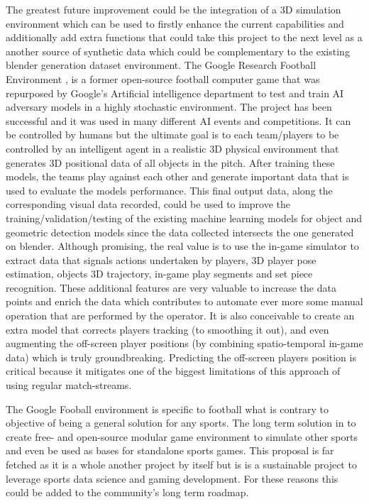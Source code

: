 \documentclass[
    11pt,
    twoside
]{report}
\begin{document}
The greatest future improvement could be the integration of a 3D simulation environment which can be used to firstly enhance the current capabilities and additionally add extra functions that could take this project to the next level as a another source of synthetic data which could be complementary to the existing blender generation dataset environment. The Google Research Football Environment \cite{gfootball_env}, is a former open-source football computer game that was repurposed by Google's Artificial intelligence department to test and train AI adversary models in a highly stochastic environment. The project has been successful and it was used in many different AI events and competitions. It can be controlled by humans but the ultimate goal is to each team/players to be controlled by an intelligent agent in a realistic 3D physical environment that generates 3D positional data of all objects in the pitch. After training these models, the teams play against each other and generate important data that is used to evaluate the models performance. This final output data, along the corresponding visual data recorded, could be used to improve the training/validation/testing of the existing machine learning models for object and geometric detection models since the data collected intersects the one generated on blender. Although promising, the real value is to use the in-game simulator to extract data that signals actions undertaken by players, 3D player pose estimation, objects 3D trajectory, in-game play segments and set piece recognition. These additional features are very valuable to increase the data points and enrich the data which contributes to automate ever more some manual operation that are performed by the operator. It is also conceivable to create an extra model that corrects players tracking (to smoothing it out), and even augmenting the off-screen player positions (by combining spatio-temporal in-game data) which is truly groundbreaking. Predicting the off-screen players position is critical because it mitigates one of the biggest limitations of this approach of using regular match-streams.


The Google Fooball environment \cite{gfootball_env} is specific to football what is contrary to objective of being a general solution for any sports. The long term solution in to create free- and open-source modular game environment to simulate other sports and even be used as bases for standalone sports games. This proposal is far fetched as it is a whole another project by itself but is is a sustainable project to leverage sports data science and gaming development. For these reasons this could be added to the community's long term roadmap.
\end{document}
